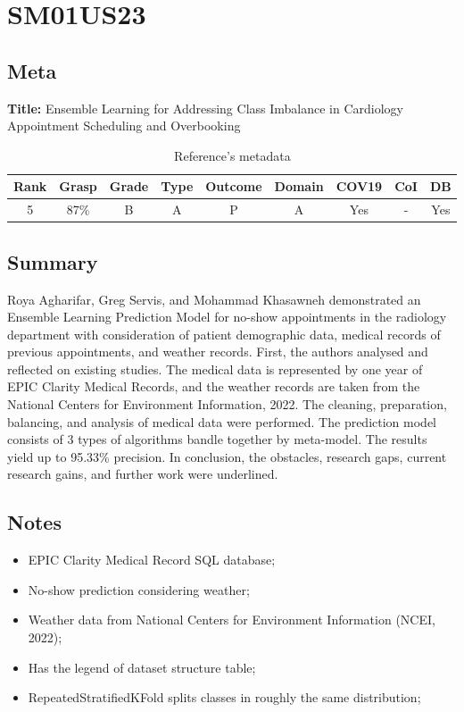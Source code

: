 \section{ SM01US23 }


\subsection{Meta}

    \textbf{Title:}
    Ensemble Learning for Addressing Class Imbalance in Cardiology Appointment Scheduling and Overbooking

    \begin{table}[H]
        \centering
        \begin{tabular}{|c|c|c|c|c|c|c|c|c|}
            \hline
                \textbf{Rank} & \textbf{Grasp} & \textbf{Grade} & \textbf{Type} & \textbf{Outcome} & \textbf{Domain} & \textbf{COV19} & \textbf{CoI} & \textbf{DB} \\
            \hline
                5 & 87\% & B & A & P & A & Yes & - & Yes \\
            \hline
        \end{tabular}
        \caption{Reference's metadata}
        \label{tab:SM01US23}
    \end{table}

\subsection{Summary}
Roya Agharifar, Greg Servis, and Mohammad Khasawneh demonstrated an Ensemble Learning Prediction Model for no-show appointments in the radiology department with consideration of patient demographic data, medical records of previous appointments, and weather records. First, the authors analysed and reflected on existing studies. The medical data is represented by one year of EPIC Clarity Medical Records, and the weather records are taken from the National Centers for Environment Information, 2022. The cleaning, preparation, balancing, and analysis of medical data were performed. The prediction model consists of 3 types of algorithms bandle together by meta-model. The results yield up to 95.33\% precision. In conclusion, the obstacles, research gaps, current research gains, and further work were underlined.
    

\subsection{Notes}
    \begin{itemize}
        \item EPIC Clarity Medical Record SQL database;
        \item No-show prediction considering weather;
        \item Weather data from National Centers for Environment Information (NCEI, 2022);
        \item Has the legend of dataset structure table;
        \item RepeatedStratifiedKFold splits classes in roughly the same distribution;
    \end{itemize}


